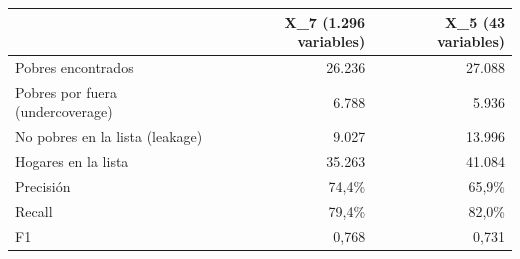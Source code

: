 
\begin{tabular}{lrr}
\toprule
  & X\_7 (1.296 variables) & X\_5 (43 variables)\\
\midrule
Pobres encontrados & 26.236 & 27.088\\
Pobres por fuera (undercoverage) & 6.788 & 5.936\\
No pobres en la lista (leakage) & 9.027 & 13.996\\
Hogares en la lista & 35.263 & 41.084\\
Precisión & 74,4\% & 65,9\%\\
Recall & 79,4\% & 82,0\%\\
F1 & 0,768 & 0,731\\
\bottomrule
\end{tabular}
